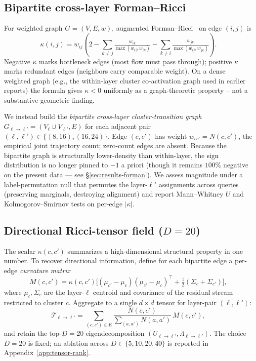 \documentclass[10pt,twocolumn]{article}
\begin{document}
\subsection{Bipartite cross-layer Forman--Ricci}
\label{sec:method-forman}

For weighted graph $G{=}(V,E,w)$, augmented Forman--Ricci~\citep{sreejith2016forman} on edge $(i,j)$ is
\begin{equation}
\kappa(i,j) = w_{ij}\!\left(2 - \!\!\sum_{k\neq j} \tfrac{w_{ik}}{\max(w_{ij},w_{ik})} - \!\!\sum_{k\neq i} \tfrac{w_{jk}}{\max(w_{ij},w_{jk})}\right).
\label{eq:forman}
\end{equation}
Negative $\kappa$ marks bottleneck edges (most flow must pass through); positive $\kappa$ marks redundant edges (neighbors carry comparable weight). On a dense weighted graph (e.g., the within-layer cluster co-activation graph used in earlier reports) the formula gives $\kappa{<}0$ uniformly as a graph-theoretic property -- not a substantive geometric finding.

We instead build the \emph{bipartite cross-layer cluster-transition graph} $G_{\ell\to\ell'}{=}(V_\ell\cup V_{\ell'},E)$ for each adjacent pair $(\ell,\ell')\in\{(8,16),(16,24)\}$. Edge $(c,c')$ has weight $w_{cc'}{=}N(c,c')$, the empirical joint trajectory count; zero-count edges are absent. Because the bipartite graph is structurally lower-density than within-layer, the sign distribution is no longer pinned to $-1$ a priori (though it remains $100\%$ negative on the present data — see \S\ref{sec:results-forman}). We assess magnitude under a label-permutation null that permutes the layer-$\ell'$ assignments across queries (preserving marginals, destroying alignment) and report Mann--Whitney $U$ and Kolmogorov--Smirnov tests on per-edge $|\kappa|$.

\subsection{Directional Ricci-tensor field ($D{=}20$)}
\label{sec:method-tensor}

The scalar $\kappa(c,c')$ summarizes a high-dimensional structural property in one number. To recover directional information, define for each bipartite edge a per-edge \emph{curvature matrix}
\begin{equation}
M(c,c')=\kappa(c,c')\bigl[(\mu_{c'}{-}\mu_c)(\mu_{c'}{-}\mu_c)^{\!\top} + \tfrac{1}{2}(\Sigma_c+\Sigma_{c'})\bigr],
\end{equation}
where $\mu_c,\Sigma_c$ are the layer-$\ell$ centroid and covariance of the residual stream restricted to cluster $c$. Aggregate to a single $d{\times}d$ tensor for layer-pair $(\ell,\ell')$:
\begin{equation}
\mathcal{T}_{\ell\to\ell'} = \sum_{(c,c')\in E}\frac{N(c,c')}{\sum_{(a,a')}N(a,a')}\,M(c,c'),
\end{equation}
and retain the top-$D{=}20$ eigendecomposition $(U_{\ell\to\ell'},\Lambda_{\ell\to\ell'})$. The choice $D{=}20$ is fixed; an ablation across $D\in\{5,10,20,40\}$ is reported in Appendix~\ref{app:tensor-rank}.
\end{document}
